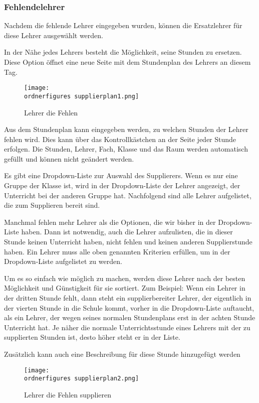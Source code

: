 \subsubsection{Fehlendelehrer}
Nachdem die fehlende Lehrer eingegeben wurden, können die Ersatzlehrer für diese Lehrer ausgewählt werden.

In der Nähe jedes Lehrers besteht die Möglichkeit, seine Stunden zu ersetzen. Diese Option öffnet eine neue Seite mit dem Stundenplan des Lehrers an diesem Tag.

\begin{figure}[H]
	\centering
	\texttt{[image: \\ordnerfigures supplierplan1.png]}
	\caption{Lehrer die Fehlen}
	\label{fi:fehlendeLehrer}
\end{figure}

Aus dem Stundenplan kann eingegeben werden, zu welchen Stunden der Lehrer fehlen wird. Dies kann über das Kontrollkästchen an der Seite jeder Stunde erfolgen. Die Stunden, Lehrer, Fach, Klasse und das Raum werden automatisch gefüllt und können nicht geändert werden.

Es gibt eine Dropdown-Liste zur Auswahl des Supplierers. Wenn es nur eine Gruppe der Klasse ist, wird in der Dropdown-Liste der Lehrer angezeigt, der Unterricht bei der anderen Gruppe hat. Nachfolgend sind alle Lehrer aufgelistet, die zum Supplieren bereit sind. 

Manchmal fehlen mehr Lehrer als die Optionen, die wir bisher in der Dropdown-Liste haben. Dann ist notwendig, auch die Lehrer aufzulisten, die in dieser Stunde keinen Unterricht haben, nicht fehlen und keinen anderen Supplierstunde haben. Ein Lehrer muss alle oben genannten Kriterien erfüllen, um in der Dropdown-Liste aufgelistet zu werden.

Um es so einfach wie möglich zu machen, werden diese Lehrer nach der besten Möglichkeit und Günstigkeit für sie sortiert. Zum Beispiel:  Wenn ein Lehrer in der dritten Stunde fehlt, dann steht ein supplierbereiter Lehrer, der eigentlich in der vierten Stunde in die Schule kommt, vorher in die Dropdown-Liste auftaucht, als ein Lehrer, der wegen seines normalen Stundenplans erst in der achten Stunde Unterricht hat. Je näher die normale Unterrichtsstunde eines Lehrers mit der zu supplierten Stunden ist, desto höher steht er in der Liste.

Zusätzlich kann auch eine Beschreibung für diese Stunde hinzugefügt werden

\begin{figure}[H]
	\centering
	\texttt{[image: \\ordnerfigures supplierplan2.png]}
	\caption{Lehrer die Fehlen supplieren}
	\label{fi:supplieren}
\end{figure} 

